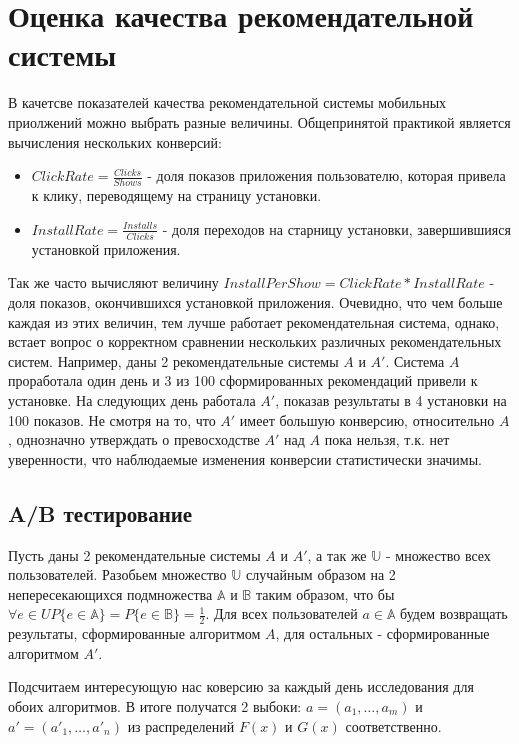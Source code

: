 \documentclass[12pt,a4paper]{report}
\begin{document}
\section{Оценка качества рекомендательной системы}
В качетсве показателей качества рекомендательной системы мобильных приолжений можно выбрать разные величины. Общепринятой практикой является вычисления нескольких конверсий:
\begin{itemize}
\item $ClickRate = \frac{Clicks}{Shows}$ - доля показов приложения пользователю, которая привела к клику, переводящему на страницу установки.
\item $InstallRate = \frac{Installs}{Clicks}$ - доля переходов на старницу установки, завершившияся установкой приложения.
\end{itemize}
Так же часто вычисляют величину $InstallPerShow = ClickRate * InstallRate$ - доля показов, окончившихся установкой приложения.
Очевидно, что чем больше каждая из этих величин, тем лучше работает рекомендательная система, однако, встает вопрос о корректном сравнении нескольких различных рекомендательных систем.
Например, даны 2 рекомендательные системы $A$ и $A'$. Система $A$ проработала один день и 3 из 100 сформированных рекомендаций привели к установке. На следующих день работала $A'$, показав результаты в 4 установки на 100 показов. Не смотря на то, что $A'$ имеет большую конверсию, относительно $A$, однозначно утверждать о превосходстве $A'$ над $A$ пока нельзя, т.к. нет уверенности, что наблюдаемые изменения конверсии статистически значимы.

\subsection{A/B тестирование}
Пусть даны 2 рекомендательные системы $A$ и $A'$, а так же $\mathbb{U}$ - множество всех пользователей. Разобьем множество $\mathbb{U}$ случайным образом на 2 непересекающихся подмножества $\mathbb{A}$ и  $\mathbb{B}$ таким образом, что бы $\forall e \in U \textit{P}\{e \in \mathbb{A}\} = \textit{P}\{e \in \mathbb{B}\} = \frac{1}{2}$.
Для всех пользователей $a \in \mathbb{A}$ будем возвращать результаты, сформированные алгоритмом $A$, для остальных - сформированные алгоритмом $A'$.

Подсчитаем интересующую нас коверсию за каждый день исследования для обоих алгоритмов. В итоге получатся 2 выбоки: $a = (a_1, \dots, a_m)$ и $a' = (a'_1, \dots, a'_n)$ из распределений $F(x)$ и $G(x)$ соответственно.
\end{document}
